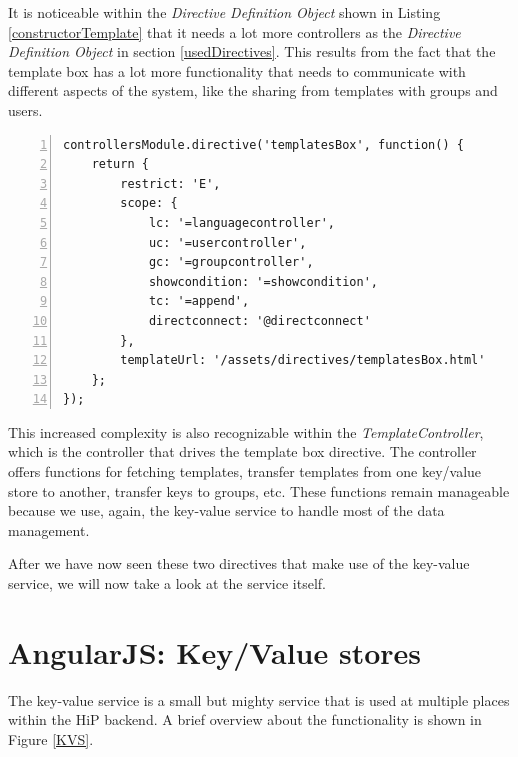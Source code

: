 It is noticeable within the \emph{Directive Definition Object} shown in Listing \ref{constructorTemplate} that it needs a lot more controllers as the \emph{Directive Definition Object} in section \ref{usedDirectives}. This results from the fact that the template box has a lot more functionality that needs to communicate with different aspects of the system, like the sharing from templates with groups and users.

\begin{lstlisting}[numbers=left,caption={The listing shows the initialisation of the template box directive},label=constructorTemplate,frame=tlbr,breaklines]
controllersModule.directive('templatesBox', function() {
    return {
        restrict: 'E',
        scope: {
            lc: '=languagecontroller',
            uc: '=usercontroller',
            gc: '=groupcontroller',
            showcondition: '=showcondition',
            tc: '=append',
            directconnect: '@directconnect'
        },
        templateUrl: '/assets/directives/templatesBox.html'
    };
});
\end{lstlisting}

This increased complexity is also recognizable within the \emph{TemplateController}, which is the controller that drives the template box directive. The controller offers functions for fetching templates, transfer templates from one key/value store to another, transfer keys to groups, etc. These functions remain manageable because we use, again, the key-value service to handle most of the data management. 

After we have now seen these two directives that make use of the key-value service, we will now take a look at the service itself.

\section{AngularJS: Key/Value stores}
\label{keyValueService}

The key-value service is a small but mighty service that is used at multiple places within the \ac{HiP} backend. A brief overview about the functionality is shown in Figure \ref{KVS}.

